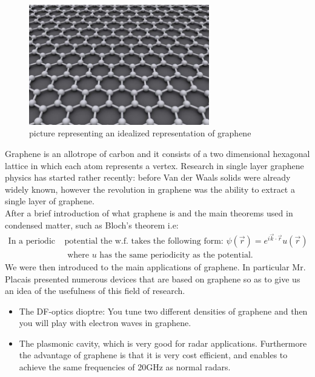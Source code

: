 \documentclass[12pt,a4paper]{article}
\begin{document}
\begin{figure}[h]
\caption{picture representing an idealized representation of graphene}
\centering
\includegraphics[width=0.7\textwidth]{graphene}
\end{figure}
Graphene is an allotrope of carbon and it consists of a two dimensional hexagonal lattice in which each atom represents a vertex.
Research in single layer graphene physics has started rather recently: before Van der Waals solids were already widely known, however the revolution in graphene was the ability to extract a single layer of graphene. \\
After a brief introduction of what graphene is and the main theorems used in condensed matter, such as Bloch's theorem i.e:
\begin{align*}
\text{In a periodic } &\text{potential the w.f. takes the following form: } \psi(\vec{r}) = e^{i \vec{k} \cdot \vec{r}} u (\vec{r}) \\ 
&\text{ where } u \text{ has the same periodicity as the potential.}
\end{align*}
We were then introduced to the main applications of graphene. In particular Mr. Placais presented numerous devices that are based on graphene so as to give us an idea of the usefulness of this field of research.
\begin{itemize}
\item The DF-optics dioptre: You tune two different densities of graphene and then you will play with electron waves in graphene.
\item The plasmonic cavity, which is very good for radar applications. Furthermore the advantage of graphene is that it is very cost efficient, and enables to achieve the same frequencies of 20GHz as normal radars.
\end{itemize}
\end{document}
